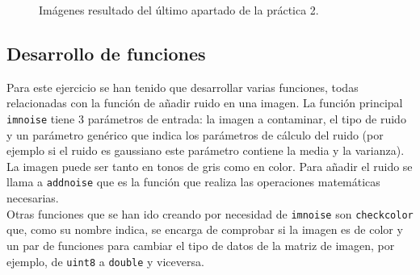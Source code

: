 \documentclass[a4paper,12pt]{report}
\begin{document}
\begin{figure}[!tbp]
  \centering
  \hfill
  \caption{Imágenes resultado del último apartado de la práctica 2.}
  \label{p2final}
\end{figure}


\subsection{Desarrollo de funciones}

Para este ejercicio se han tenido que desarrollar varias funciones, todas relacionadas con la función de añadir ruido en una imagen. La función principal \texttt{imnoise} tiene 3 parámetros de entrada: la imagen a contaminar, el tipo de ruido y un parámetro genérico que indica los parámetros de cálculo del ruido (por ejemplo si el ruido es gaussiano este parámetro contiene la media y la varianza). La imagen puede ser tanto en tonos de gris como en color. Para añadir el ruido se llama a \texttt{addnoise} que es la función que realiza las operaciones matemáticas necesarias.\\

Otras funciones que se han ido creando por necesidad de \texttt{imnoise} son \texttt{checkcolor} que, como su nombre indica, se encarga de comprobar si la imagen es de color y un par de funciones para cambiar el tipo de datos de la matriz de imagen, por ejemplo, de \texttt{uint8} a \texttt{double} y viceversa.
\end{document}
